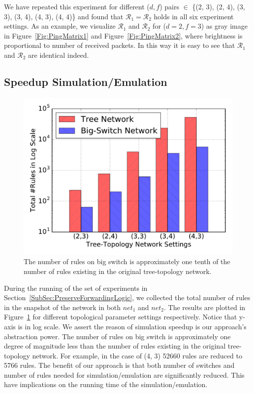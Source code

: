 We have repeated this experiment for different ($d, f$) pairs $\in$
\{(2, 3), (2, 4), (3, 3), (3, 4), (4, 3), (4, 4)\} and found that
$\mathcal{R}_1 = \mathcal{R}_2$ holds in all six experiment settings.
As an example, we visualize $\mathcal{R}_1$ and $\mathcal{R}_2$ for ($d=2, f=3$) as gray image
in Figure~\ref{Fig:PingMatrix1} and Figure~\ref{Fig:PingMatrix2},
where brightness is proportional to number of received packets.
In this way it is easy to see that $\mathcal{R}_1$ and $\mathcal{R}_2$ are identical indeed.


\subsection{Speedup Simulation/Emulation}

\begin{figure}[h]
\centering
\includegraphics[scale=.42]{figures/comp_num_rules.pdf}
\caption{The number of rules on big switch is approximately one tenth of the
        number of rules existing in the original tree-topology network.}
\label{Fig:CompareNumRules}
\end{figure}

During the running of the set of experiments in Section~\ref{SubSec:PreserveForwardingLogic},
we collected the total number of rules in the snapshot of the network in both $net_1$
and $net_2$.
The results are plotted in Figure~\ref{Fig:CompareNumRules} for different
topological parameter settings respectively.
Notice that y-axis is in log scale.
We assert the reason of simulation speedup is our approach's abstraction power.
The number of rules on big switch is approximately one degree of magnitude less
than the number of rules existing in the original tree-topology network.
For example, in the case of (4, 3) 52660 rules are reduced to 5766 rules.
The benefit of our approach is that both number of switches and number of rules needed
for simulation/emulation are significantly reduced.
This have implications on the running time of the simulation/emulation.

